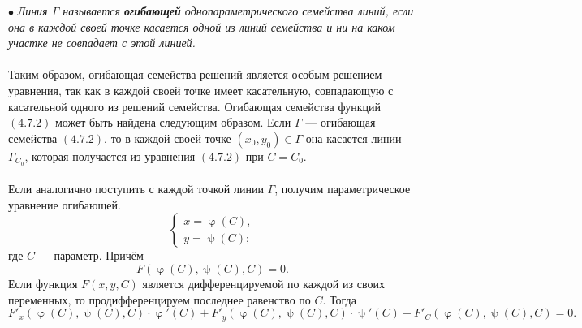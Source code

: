 \documentclass[a4paper, 12pt]{report}
\renewcommand{\varphi}{\upvarphi}
\renewcommand{\psi}{\uppsi}
\begin{document}
$\bullet$ \textit{Линия $\Gamma$ называется \textbf{огибающей} однопараметрического семейства линий, если она в каждой своей точке касается одной из линий семейства и ни на каком участке не совпадает с этой линией.}\\\\
Таким образом, огибающая семейства решений является особым решением уравнения, так как в каждой своей точке имеет касательную, совпадающую с касательной одного из решений семейства.
Огибающая семейства функций $(4.7.2)$ может быть найдена следующим образом. Если $\Gamma$ --- огибающая семейства $(4.7.2)$, то в каждой своей точке $(x_0,y_0) \in \Gamma$ она касается линии $\Gamma_{C_0}$, которая получается из уравнения $(4.7.2)$ при $C = C_0$.\\\\
Если аналогично поступить с каждой точкой линии $\Gamma$, получим параметрическое уравнение огибающей. $$\begin{cases}
	x = \varphi(C), \\
	y = \psi(C);
\end{cases}
$$ где $C$ --- параметр.
Причём $$F(\varphi(C), \psi(C), C) = 0.$$
Если функция $F(x, y, C)$ является дифференцируемой по каждой из своих переменных, то продифференцируем последнее равенство по $C$. Тогда $$F'_x(\varphi(C), \psi(C), C)\cdot \varphi'(C) + F'_y(\varphi(C), \psi(C), C)\cdot \psi'(C) + F'_C(\varphi(C), \psi(C), C) = 0.$$
\end{document}
